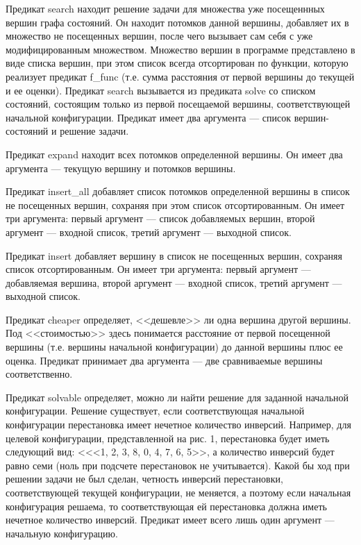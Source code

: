 \documentclass{article}
\begin{document}
Предикат search находит решение задачи для множества уже посещеннных
вершин графа состояний. Он находит потомков данной вершины, добавляет
их в множество не посещенных вершин, после чего вызывает сам себя с
уже модифицированным множеством. Множество вершин в программе
представлено в виде списка вершин, при этом список всегда отсортирован
по функции, которую реализует предикат f\_func (т.е. сумма расстояния
от первой вершины до текущей и ее оценки). Предикат search вызывается
из предиката solve со списком состояний, состоящим только из первой
посещаемой вершины, соответствующей начальной конфигурации. Предикат
имеет два аргумента --- список вершин-состояний и решение задачи.

Предикат expand находит всех потомков определенной вершины. Он имеет
два аргумента --- текущую вершину и потомков вершины.

Предикат insert\_all добавляет список потомков определенной вершины в
список не посещенных вершин, сохраняя при этом список
отсортированным. Он имеет три аргумента: первый аргумент --- список
добавляемых вершин, второй аргумент --- входной список, третий
аргумент --- выходной список.

Предикат insert добавляет вершину в список не посещенных вершин,
сохраняя список отсортированным. Он имеет три аргумента: первый
аргумент --- добавляемая вершина, второй аргумент --- входной список,
третий аргумент --- выходной список.

Предикат cheaper определяет, <<дешевле>> ли одна вершина другой
вершины. Под <<стоимостью>> здесь понимается расстояние от первой
посещенной вершины (т.е. вершины начальной конфигурации) до данной
вершины плюс ее оценка. Предикат принимает два аргумента --- две
сравниваемые вершины соответственно.

Предикат solvable определяет, можно ли найти решение для заданной
начальной конфигурации. Решение существует, если соответствующая
начальной конфигурации перестановка имеет нечетное количество
инверсий. Например, для целевой конфигурации, представленной на
рис. 1, перестановка будет иметь следующий вид: <<<1, 2, 3, 8, 0, 4,
7, 6, 5>>, а количество инверсий будет равно семи (ноль при подсчете
перестановок не учитывается). Какой бы ход при решении задачи не был
сделан, четность инверсий перестановки, соответствующей текущей
конфигурации, не меняется, а поэтому если начальная конфигурация
решаема, то соответствующая ей перестановка должна иметь нечетное
количество инверсий. Предикат имеет всего лишь один аргумент ---
начальную конфигурацию.
\end{document}
